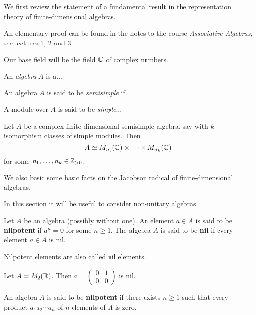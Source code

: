 \chapter{}


We first review the statement of a fundamental result in the 
representation theory of finite-dimensional algebras. 

An elementary proof can be found in the
notes to the course \emph{Associative Algebras}, see
lectures 1, 2 and 3. 

Our base field will be the field $\mathbb{C}$ of complex numbers. 

An \emph{algebra} $A$ is a...

An algebra $A$ is said to be \emph{semisimple} if...

A module over $A$ is said to be \emph{simple}...

\begin{theorem}
Let $A$ be a complex finite-dimensional semisimple algebra, say with  
$k$ isomorphism classes of simple modules. Then 
\[
A\simeq M_{n_1}(\mathbb{C})\times\cdots\times M_{n_k}(\mathbb{C})
\]
for some $n_1,\dots,n_k\in\mathbb{Z}_{>0}$.
\end{theorem}

We also basic some basic facts on the Jacobson radical
of finite-dimensional algebras. 


In this section it will be useful to consider 
non-unitary algebras. 

\begin{definition}
    Let $A$ be an algebra (possibly without one). An element $a\in A$
    is said to be \textbf{nilpotent} if 
    $a^n=0$ for some $n\geq1$. The algebra $A$ is said to be
    \textbf{nil} if every element $a\in A$ is nil. 
\end{definition}

Nilpotent elements are also called nil elements.  

\begin{example}
    Let $A=M_2(\mathbb{R})$. Then $a=\begin{pmatrix}0&1\\0&0\end{pmatrix}$ is nil. 
\end{example}

\begin{definition}
    An algebra $A$ is said to be \textbf{nilpotent} if there exists
    $n\geq1$ such that every product 
    $a_1a_2\cdots a_n$
    of $n$ elements of $A$ is zero. 
\end{definition}

